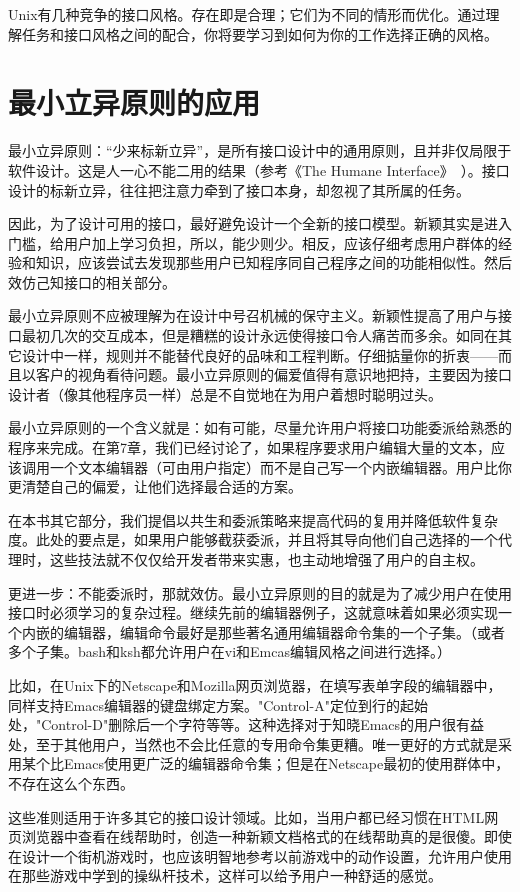 \documentclass[12pt,oneside]{ctexbook}
\begin{document}
\begin{common-format}
Unix有几种竞争的接口风格。存在即是合理；它们为不同的情形而优化。通过理解任务和接口风格之间的配合，你将要学习到如何为你的工作选择正确的风格。

\section{最小立异原则的应用}
最小立异原则：“少来标新立异”，是所有接口设计中的通用原则，且并非仅局限于软件设计。这是人一心不能二用的结果（参考《The Humane Interface》~\cite{Raskin}）。接口设计的标新立异，往往把注意力牵到了接口本身，却忽视了其所属的任务。

因此，为了设计可用的接口，最好避免设计一个全新的接口模型。新颖其实是进入门槛，给用户加上学习负担，所以，能少则少。相反，应该仔细考虑用户群体的经验和知识，应该尝试去发现那些用户已知程序同自己程序之间的功能相似性。然后效仿己知接口的相关部分。

最小立异原则不应被理解为在设计中号召机械的保守主义。新颖性提高了用户与接口最初几次的交互成本，但是糟糕的设计永远使得接口令人痛苦而多余。如同在其它设计中一样，规则并不能替代良好的品味和工程判断。仔细掂量你的折衷——而且以客户的视角看待问题。最小立异原则的偏爱值得有意识地把持，主要因为接口设计者（像其他程序员一样）总是不自觉地在为用户着想时聪明过头。

最小立异原则的一个含义就是：如有可能，尽量允许用户将接口功能委派给熟悉的程序来完成。在第7章，我们已经讨论了，如果程序要求用户编辑大量的文本，应该调用一个文本编辑器（可由用户指定）而不是自己写一个内嵌编辑器。用户比你更清楚自己的偏爱，让他们选择最合适的方案。

在本书其它部分，我们提倡以共生和委派策略来提高代码的复用并降低软件复杂度。此处的要点是，如果用户能够截获委派，并且将其导向他们自己选择的一个代理时，这些技法就不仅仅给开发者带来实惠，也主动地增强了用户的自主权。

更进一步：不能委派时，那就效仿。最小立异原则的目的就是为了减少用户在使用接口时必须学习的复杂过程。继续先前的编辑器例子，这就意味着如果必须实现一个内嵌的编辑器，编辑命令最好是那些著名通用编辑器命令集的一个子集。（或者多个子集。bash和ksh都允许用户在vi和Emcas编辑风格之间进行选择。）

比如，在Unix下的Netscape和Mozilla网页浏览器，在填写表单字段的编辑器中，同样支持Emacs编辑器的键盘绑定方案。"Control-A"定位到行的起始处，"Control-D"删除后一个字符等等。这种选择对于知晓Emacs的用户很有益处，至于其他用户，当然也不会比任意的专用命令集更糟。唯一更好的方式就是采用某个比Emacs使用更广泛的编辑器命令集；但是在Netscape最初的使用群体中，不存在这么个东西。

这些准则适用于许多其它的接口设计领域。比如，当用户都已经习惯在HTML网页浏览器中查看在线帮助时，创造一种新颖文档格式的在线帮助真的是很傻。即使在设计一个街机游戏时，也应该明智地参考以前游戏中的动作设置，允许用户使用在那些游戏中学到的操纵杆技术，这样可以给予用户一种舒适的感觉。



\end{common-format}
\end{document}
